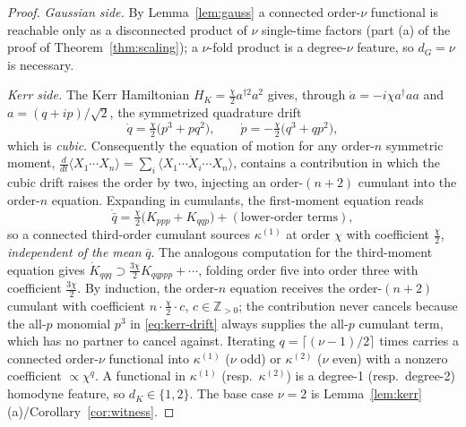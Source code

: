 \documentclass[11pt]{article}
\theoremstyle{remark}
\begin{document}
\begin{proof}
\emph{Gaussian side.} By Lemma~\ref{lem:gauss} a connected order-$\nu$ functional
is reachable only as a disconnected product of $\nu$ single-time factors
(part (a) of the proof of Theorem~\ref{thm:scaling}); a $\nu$-fold product is a
degree-$\nu$ feature, so $d_G=\nu$ is necessary.

\emph{Kerr side.} The Kerr Hamiltonian $H_K=\tfrac{\chi}{2}a^{\dagger2}a^2$ gives,
through $\dot a=-i\chi a^\dagger a a$ and $a=(q+ip)/\sqrt2$, the symmetrized
quadrature drift
\begin{equation}
\dot q = \tfrac{\chi}{2}\big(p^3+pq^2\big),\qquad
\dot p = -\tfrac{\chi}{2}\big(q^3+qp^2\big),
\label{eq:kerr-drift}
\end{equation}
which is \emph{cubic}. Consequently the equation of motion for any order-$n$
symmetric moment, $\frac{d}{dt}\langle X_1\cdots X_n\rangle
=\sum_i\langle X_1\cdots\dot X_i\cdots X_n\rangle$, contains a contribution in
which the cubic drift raises the order by two, injecting an order-$(n{+}2)$
cumulant into the order-$n$ equation. Expanding in cumulants, the first-moment
equation reads
\[
\dot{\bar q}=\tfrac{\chi}{2}\big(K_{ppp}+K_{qqp}\big)+(\text{lower-order terms}),
\]
so a connected third-order cumulant sources $\kappa^{(1)}$ at order $\chi$ with
coefficient $\tfrac{\chi}{2}$, \emph{independent of the mean} $\bar q$. The
analogous computation for the third-moment equation gives
$\dot K_{qqq}\supset\tfrac{3\chi}{2}K_{qqppp}+\cdots$, folding order five into
order three with coefficient $\tfrac{3\chi}{2}$. By induction, the order-$n$
equation receives the order-$(n{+}2)$ cumulant with coefficient
$n\cdot\tfrac{\chi}{2}\cdot c$, $c\in\mathbb{Z}_{>0}$; the contribution never
cancels because the all-$p$ monomial $p^3$ in \eqref{eq:kerr-drift} always supplies
the all-$p$ cumulant term, which has no partner to cancel against. Iterating
$q=\lceil(\nu-1)/2\rceil$ times carries a connected order-$\nu$ functional into
$\kappa^{(1)}$ ($\nu$ odd) or $\kappa^{(2)}$ ($\nu$ even) with a nonzero
coefficient $\propto\chi^{q}$. A functional in $\kappa^{(1)}$ (resp.\
$\kappa^{(2)}$) is a degree-1 (resp.\ degree-2) homodyne feature, so $d_K\in\{1,2\}$.
The base case $\nu=2$ is Lemma~\ref{lem:kerr}(a)/Corollary~\ref{cor:witness}.
\end{proof}
\end{document}
